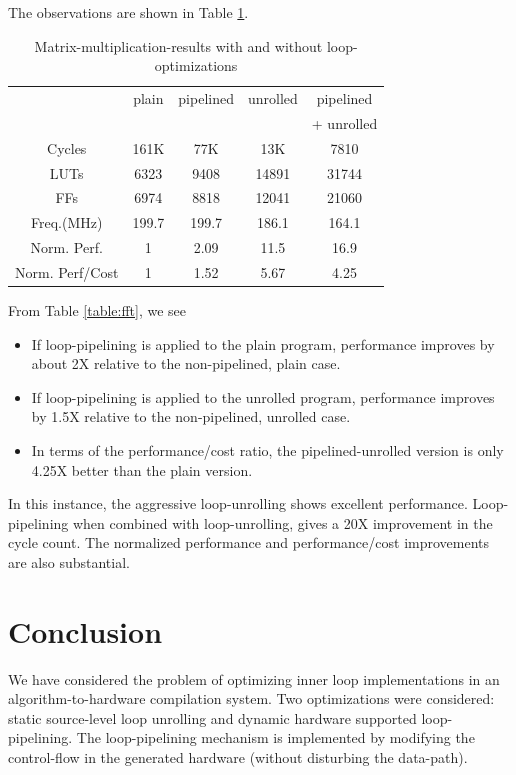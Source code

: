 \documentclass[conference]{IEEEtran}
\begin{document}
The observations are shown in Table \ref{table:mmultiply}.
\begin{table}[htb]
  \centering
  \caption{Matrix-multiplication-results  with and without loop-optimizations}
  \label{table:mmultiply}
  \renewcommand\arraystretch{1.2}
  \setlength{\tabcolsep}{1ex}
  \begin{tabular}{c|c|c|c|c}
  \hline
  & plain & pipelined & unrolled & pipelined  \\
  &       &           &          & + unrolled\\
  \hline

Cycles   &    161K  &   77K   &     13K  &     7810 \\
LUTs     &   6323   &  9408  &     14891  &    31744 \\
FFs      &    6974  &  8818  &     12041  &    21060 \\
Freq.(MHz)  & 199.7  &   199.7 &   186.1 &    164.1 \\
Norm. Perf. & 1      &  2.09  & 11.5 & 16.9 \\
Norm. Perf/Cost & 1  &  1.52  & 5.67 & 4.25 \\
\hline
  \end{tabular}
\end{table}
From Table \ref{table:fft}, we see 
\begin{itemize}
\item If loop-pipelining is 
applied to the plain program, performance improves
by about 2X relative to the non-pipelined, plain case.
\item If loop-pipelining is applied to the unrolled program,
performance improves by 1.5X relative to the non-pipelined,
unrolled case.  
\item In terms of the performance/cost
ratio, the pipelined-unrolled version is only 4.25X better than
the plain version.   
\end{itemize}
In this instance, the aggressive loop-unrolling shows
excellent performance.  Loop-pipelining when combined with loop-unrolling,
gives a 20X improvement in the cycle count.  The normalized
performance and performance/cost improvements are also substantial.

\section{Conclusion}

We have considered the problem of optimizing inner loop
implementations in an algorithm-to-hardware compilation system.
Two optimizations were considered: static source-level loop
unrolling and dynamic hardware supported loop-pipelining.
The loop-pipelining mechanism is implemented by modifying
the control-flow in the generated hardware (without disturbing
the data-path).
\end{document}
